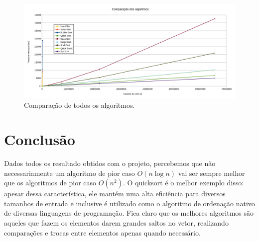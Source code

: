 \documentclass[11pt, brazil, a4paper, usenames, svgnames, dvipsnames]{article}
\begin{document}
\begin{figure}[hb]
	\centering
	\includegraphics[width=16cm]{comp_todos.png}
	\caption[Comparação de todos os algoritmos.]
	{Comparação de todos os algoritmos.}
	\label{chart:comp_todos}
\end{figure}

\FloatBarrier
\noindent
\section{Conclusão}

\hfill

Dados todos os resultado obtidos com o projeto, percebemos que não necessariamente um algoritmo de pior caso $O(n \log{n})$ vai ser sempre melhor que os algoritmos de pior caso $O(n^2)$. O quicksort é o melhor exemplo disso: apesar dessa característica, ele mantém uma alta eficiência para diversos tamanhos de entrada e inclusive é utilizado como o algoritmo de ordenação nativo de diversas linguagens de programação. Fica claro que os melhores algoritmos são aqueles que fazem os elementos darem grandes saltos no vetor, realizando comparações e trocas entre elementos apenas quando necessário.

\newpage



\nocite{*}
\end{document}
